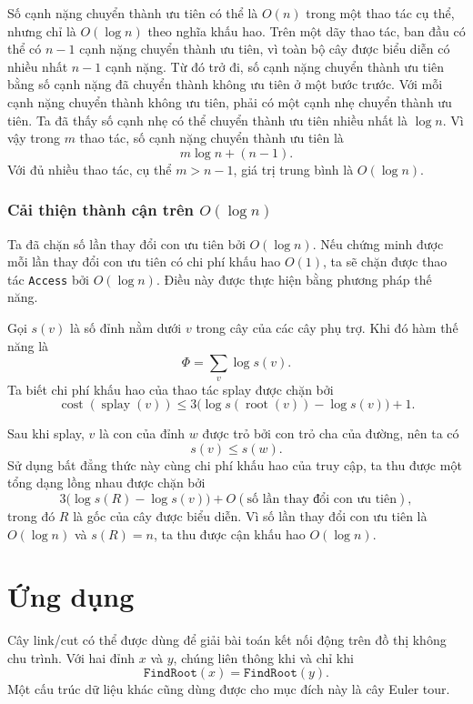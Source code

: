 \documentclass[11pt]{article}
\begin{document}
Số cạnh nặng chuyển thành ưu tiên có thể là $O(n)$ trong một thao tác cụ thể,
nhưng chỉ là $O(\log n)$ theo nghĩa khấu hao. Trên một dãy thao tác, ban đầu có
thể có $n-1$ cạnh nặng chuyển thành ưu tiên, vì toàn bộ cây được biểu diễn có
nhiều nhất $n-1$ cạnh nặng. Từ đó trở đi, số cạnh nặng chuyển thành ưu tiên
bằng số cạnh nặng đã chuyển thành không ưu tiên ở một bước trước. Với mỗi cạnh
nặng chuyển thành không ưu tiên, phải có một cạnh nhẹ chuyển thành ưu tiên. Ta
đã thấy số cạnh nhẹ có thể chuyển thành ưu tiên nhiều nhất là $\log n$. Vì vậy
trong $m$ thao tác, số cạnh nặng chuyển thành ưu tiên là
\[
  m\log n + (n-1).
\]
Với đủ nhiều thao tác, cụ thể $m > n-1$, giá trị trung bình là $O(\log n)$.

\subsubsection{\texorpdfstring{Cải thiện thành cận trên $O(\log n)$}{Cải thiện thành cận trên O(log n)}}

Ta đã chặn số lần thay đổi con ưu tiên bởi $O(\log n)$. Nếu chứng minh được
mỗi lần thay đổi con ưu tiên có chi phí khấu hao $O(1)$, ta sẽ chặn được thao
tác \texttt{Access} bởi $O(\log n)$. Điều này được thực hiện bằng phương pháp
thế năng.

Gọi $s(v)$ là số đỉnh nằm dưới $v$ trong cây của các cây phụ trợ. Khi đó hàm
thế năng là
\[
  \Phi = \sum_v \log s(v).
\]
Ta biết chi phí khấu hao của thao tác splay được chặn bởi
\[
  \operatorname{cost}(\operatorname{splay}(v))
  \le 3\bigl(\log s(\operatorname{root}(v))-\log s(v)\bigr)+1.
\]

Sau khi splay, $v$ là con của đỉnh $w$ được trỏ bởi con trỏ cha của đường, nên
ta có
\[
  s(v) \le s(w).
\]
Sử dụng bất đẳng thức này cùng chi phí khấu hao của truy cập, ta thu được một
tổng dạng lồng nhau được chặn bởi
\[
  3\bigl(\log s(R)-\log s(v)\bigr)
  + O(\text{số lần thay đổi con ưu tiên}),
\]
trong đó $R$ là gốc của cây được biểu diễn. Vì số lần thay đổi con ưu tiên là
$O(\log n)$ và $s(R)=n$, ta thu được cận khấu hao $O(\log n)$.

\section{Ứng dụng}

Cây link/cut có thể được dùng để giải bài toán kết nối động trên đồ thị không
chu trình. Với hai đỉnh $x$ và $y$, chúng liên thông khi và chỉ khi
\[
  \texttt{FindRoot}(x) = \texttt{FindRoot}(y).
\]
Một cấu trúc dữ liệu khác cũng dùng được cho mục đích này là cây Euler tour.
\end{document}
